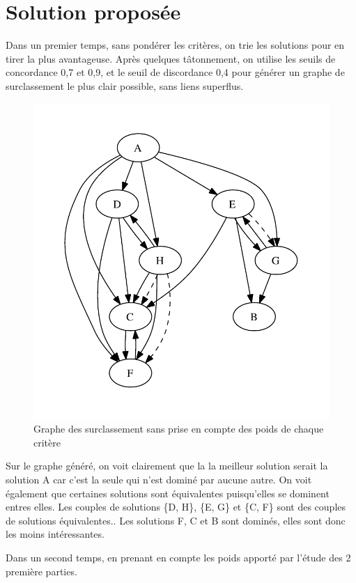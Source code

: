 \section{Solution proposée}

Dans un premier temps, sans pondérer les critères, on trie les solutions pour en tirer la plus avantageuse.
Après quelques tâtonnement, on utilise les seuils de concordance 0,7 et 0,9, et
le seuil de discordance 0,4 pour générer un graphe de surclassement le plus
clair possible, sans liens superflus.

\begin{figure}[!ht]
\includegraphics{../SourcesMatlab/electre3-1.pdf}
\caption{Graphe des surclassement sans prise en compte des poids de chaque critère}
\end{figure}

Sur le graphe généré, on voit clairement que la la meilleur solution serait la
solution A car c'est la seule qui n'est dominé par aucune autre.
On voit également que certaines solutions sont équivalentes puisqu'elles se
dominent entres elles. Les couples de solutions \{D, H\}, \{E, G\} et \{C, F\}
sont des couples de solutions équivalentes..
Les solutions F, C et B sont dominés, elles sont donc les moins intéressantes.


Dans un second temps, en prenant en compte les poids apporté par l'étude des 2 première parties.
